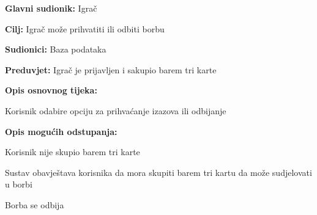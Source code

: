 					\noindent {}
					\begin{packed_item}
						
						\item \textbf{Glavni sudionik: }Igrač
						\item  \textbf{Cilj:} Igrač može prihvatiti ili odbiti borbu
						\item  \textbf{Sudionici:} Baza podataka
						\item  \textbf{Preduvjet:} Igrač je prijavljen i sakupio barem tri karte
						\item  \textbf{Opis osnovnog tijeka:}
						
						\item[] \begin{packed_enum}
							
							\item Korisnik odabire opciju za prihvaćanje izazova ili odbijanje
						\end{packed_enum}
						
						\item  \textbf{Opis mogućih odstupanja:}
						
						\item[] \begin{packed_item}
							
							\item[2.a] Korisnik nije skupio barem tri karte
							\item[] \begin{packed_enum}
								
								\item Sustav obavještava korisnika da mora skupiti barem tri kartu da može sudjelovati u borbi
								\item Borba se odbija
								
							\end{packed_enum}
						\end{packed_item}
					\end{packed_item}
					
